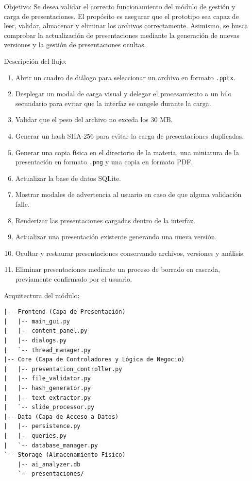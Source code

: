 \documentclass[11pt]{article}
\begin{document}
Objetivo: Se desea validar el correcto funcionamiento del módulo de gestión y carga de presentaciones. El propósito es asegurar que el prototipo sea capaz de leer, validar, almacenar y eliminar los archivos correctamente. Asimismo, se busca comprobar la actualización de presentaciones mediante la generación de nuevas versiones y la gestión de presentaciones ocultas.

Descripción del flujo:
\begin{enumerate}
    \item Abrir un cuadro de diálogo para seleccionar un archivo en formato \texttt{.pptx}.
    \item Desplegar un modal de carga visual y delegar el procesamiento a un hilo secundario para evitar que la interfaz se congele durante la carga.
    \item Validar que el peso del archivo no exceda los 30 MB.
    \item Generar un hash SHA-256 para evitar la carga de presentaciones duplicadas.
    \item Generar una copia física en el directorio de la materia, una miniatura de la presentación en formato \texttt{.png} y una copia en formato PDF.
    \item Actualizar la base de datos SQLite.
    \item Mostrar modales de advertencia al usuario en caso de que alguna validación falle.
    \item Renderizar las presentaciones cargadas dentro de la interfaz.
    \item Actualizar una presentación existente generando una nueva versión.
    \item Ocultar y restaurar presentaciones conservando archivos, versiones y análisis.
    \item Eliminar presentaciones mediante un proceso de borrado en cascada, previamente confirmado por el usuario.
\end{enumerate}

Arquitectura del módulo:
\begin{verbatim}
|-- Frontend (Capa de Presentación)
|   |-- main_gui.py
|   |-- content_panel.py
|   |-- dialogs.py
|   `-- thread_manager.py
|-- Core (Capa de Controladores y Lógica de Negocio)
|   |-- presentation_controller.py
|   |-- file_validator.py
|   |-- hash_generator.py
|   |-- text_extractor.py
|   `-- slide_processor.py
|-- Data (Capa de Acceso a Datos)
|   |-- persistence.py
|   |-- queries.py
|   `-- database_manager.py
`-- Storage (Almacenamiento Físico)
    |-- ai_analyzer.db
    `-- presentaciones/
\end{verbatim}
\end{document}
